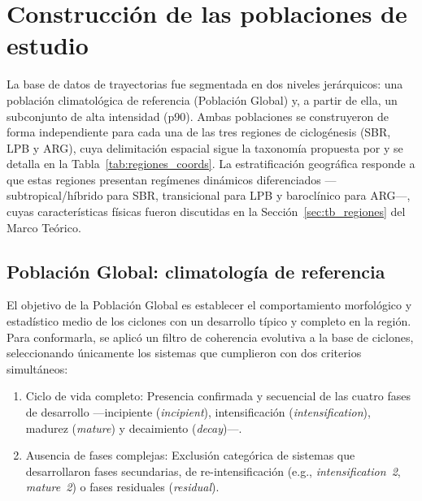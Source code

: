 


\section{Construcción de las poblaciones de estudio}\label{sec:poblaciones_estudio}

La base de datos de trayectorias fue segmentada en dos niveles jerárquicos: una población climatológica de referencia (Población Global) y, a partir de ella, un subconjunto de alta intensidad (p90). Ambas poblaciones se construyeron de forma independiente para cada una de las tres regiones de ciclogénesis (SBR, LPB y ARG), cuya delimitación espacial sigue la taxonomía propuesta por \citet{gramcianinov2019properties} y se detalla en la Tabla~\ref{tab:regiones_coords}. La estratificación geográfica responde a que estas regiones presentan regímenes dinámicos diferenciados —subtropical/híbrido para SBR, transicional para LPB y baroclínico para ARG—, cuyas características físicas fueron discutidas en la Sección~\ref{sec:tb_regiones} del Marco Teórico.



\subsection{Población Global: climatología de referencia}\label{subsec:grupo_global}

El objetivo de la Población Global es establecer el comportamiento morfológico y estadístico medio de los ciclones con un desarrollo típico y completo en la región. Para conformarla, se aplicó un filtro de coherencia evolutiva a la base de ciclones, seleccionando únicamente los sistemas que cumplieron con dos criterios simultáneos:

\begin{enumerate}
    \item Ciclo de vida completo: Presencia confirmada y secuencial de las cuatro fases de desarrollo —incipiente (\textit{incipient}), intensificación (\textit{intensification}), madurez (\textit{mature}) y decaimiento (\textit{decay})—.
    \item Ausencia de fases complejas: Exclusión categórica de sistemas que desarrollaron fases secundarias, de re-intensificación (e.g., \textit{intensification~2}, \textit{mature~2}) o fases residuales (\textit{residual}).
\end{enumerate}

